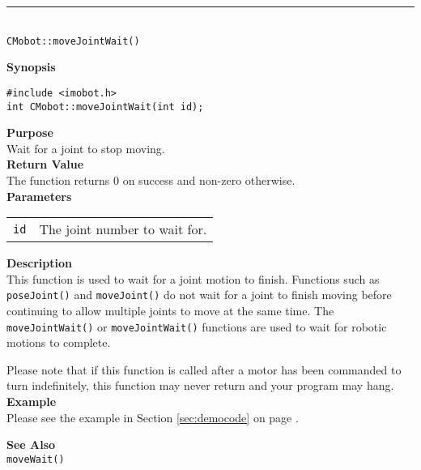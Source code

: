 \noindent
\vspace{5pt}
\rule{4.5in}{0.015in}\\
\noindent
{\LARGE \texttt{CMobot::moveJointWait()}}\\
{}

\noindent
{\bf Synopsis}\\
\begin{verbatim}
#include <imobot.h>
int CMobot::moveJointWait(int id);
\end{verbatim}

\noindent
{\bf Purpose}\\
Wait for a joint to stop moving.\\

\noindent
{\bf Return Value}\\
The function returns 0 on success and non-zero otherwise.\\

\noindent
{\bf Parameters}
\vspace{-0.1in}
\begin{description}
\item               
\begin{tabular}{p{10 mm}p{145 mm}}
\texttt{id} & The joint number to wait for. \\
\end{tabular}
\end{description}

\noindent
{\bf Description}\\
This function is used to wait for a joint motion to finish. Functions such as
\texttt{poseJoint()} and \texttt{moveJoint()} do not wait for a joint to finish
moving before continuing to allow multiple joints to move at the same time. The
\texttt{moveJointWait()} or \texttt{moveJointWait()} functions are used to wait for
robotic motions to complete.

Please note that if this function is called after a motor has been commanded to
turn indefinitely, this function may never return and your program may hang.\\

\noindent
{\bf Example}\\
Please see the example in Section \ref{sec:democode} on page \pageref{sec:democode}.\\
\noindent

\noindent
{\bf See Also}\\
\texttt{moveWait()}

